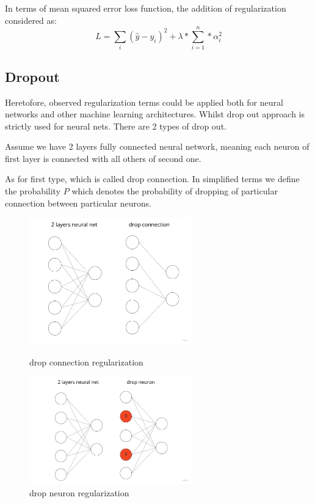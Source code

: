 In terms of mean squared error loss function, the addition of regularization considered as:
\[ L = \sum_{i}(\hat{y}-y_i)^2 + \lambda*\sum_{i=1}^{n}*\alpha_i^2\]

\subsection{Dropout}
Heretofore, observed regularization terms could be applied both for neural networks and other machine learning architectures. Whilst drop out approach is strictly used for neural nets. There are 2 types of drop out. 

Assume we have 2 layers fully connected neural network, meaning each neuron of first layer is connected with all others of second one. 

As for first type, which is called drop connection. In simplified terms we define the probability $P$ which denotes the probability of dropping of particular connection between particular neurons.  

\begin{figure}[H]
\centering
\begin{minipage}{.48\linewidth}
    \includegraphics[width=7cm]{images/drop_connection.jpg}
    \caption {drop connection regularization}
    \label{fig:drop_connection}
\end{minipage}
\hfill
\begin{minipage}{.48\linewidth}
    \includegraphics[width=7cm]{images/drop_neuron.jpg}
    \caption {drop neuron regularization}
    \label{fig:drop_neuron}
\end{minipage}
\end{figure}

